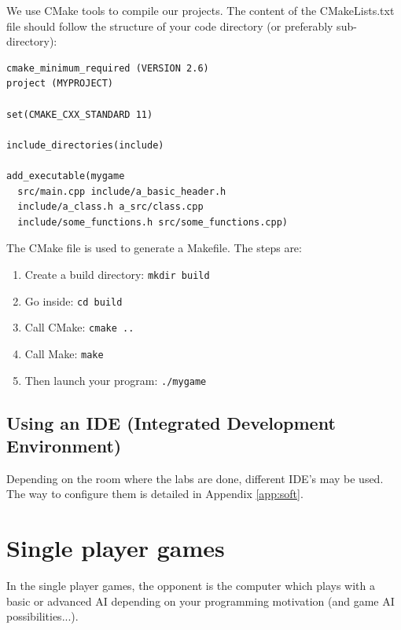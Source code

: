 \documentclass{ecnreport}
\begin{document}
We use CMake tools to compile our projects.
The content of the CMakeLists.txt file should follow the structure of your code directory (or preferably sub-directory):
\begin{center}
\begin{minipage}{.4\linewidth}
\end{minipage}
\begin{minipage}{.55\linewidth}\pythonstyle
\begin{lstlisting}
cmake_minimum_required (VERSION 2.6)
project (MYPROJECT)

set(CMAKE_CXX_STANDARD 11)

include_directories(include)

add_executable(mygame 
  src/main.cpp include/a_basic_header.h
  include/a_class.h a_src/class.cpp
  include/some_functions.h src/some_functions.cpp)
\end{lstlisting} \end{minipage}
\end{center}

The CMake file is used to generate a Makefile. The steps are:
\begin{enumerate}
 \item Create a build directory: \texttt{mkdir build}
 \item Go inside: \texttt{cd build}
 \item Call CMake: \texttt{cmake ..}
 \item Call Make: \texttt{make}
 \item Then launch your program: \texttt{./mygame}
\end{enumerate}

\subsection{Using an IDE (Integrated Development Environment)}

Depending on the room where the labs are done, different IDE's may be used. The way to configure them is detailed in Appendix \ref{app:soft}.


\section{Single player games}

In the single player games, the opponent is the computer which plays with a basic or advanced AI depending on your programming
motivation (and game AI possibilities...).
\end{document}
